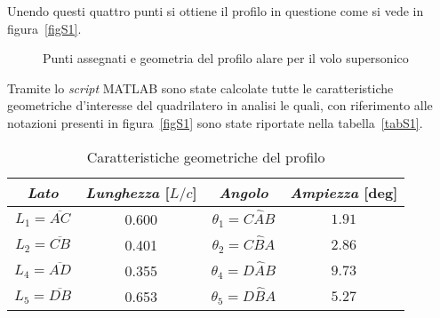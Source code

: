 Unendo questi quattro punti si ottiene il profilo in questione come si vede in figura~\vref{figS1}.
\begin{figure}[h!]
\centering
{}
\caption{\footnotesize Punti assegnati e geometria del profilo alare per il volo supersonico}
\label{figS1}
\end{figure}

Tramite lo {\itshape script} MATLAB sono state calcolate tutte le caratteristiche geometriche d'interesse del quadrilatero in analisi le quali, con riferimento alle notazioni presenti in figura~\vref{figS1} sono state riportate nella tabella~\vref{tabS1}.%

\begin{table} [!h]\centering {}
\begin{tabular}{c  c  c c }
\toprule
\emph{Lato} & \emph{Lunghezza} [$L/c$] & \emph{Angolo} & \emph{Ampiezza} [deg]  \\
\midrule
$L_1=\overline{AC}$  &  0.600 &   $\theta_1=C\widehat{A}B$ &  $1.91$   \\   
$L_2=\overline{CB}$  &  0.401 &   $\theta_2=C\widehat{B}A$  &  $2.86$ \\ 
$L_4=\overline{AD}$  &  0.355 & $\theta_4= D\widehat{A}B $ &  $9.73 $ \\ 
$L_5=\overline{DB}$  &  0.653 &  $\theta_5= D\widehat{B}A$ &  $5.27 $ \\ 
\bottomrule
\end{tabular}
\caption {\footnotesize Caratteristiche geometriche del profilo}
\label{tabS1}
\end{table}

